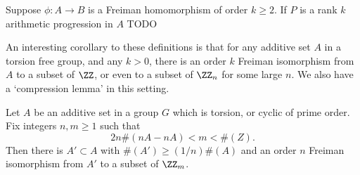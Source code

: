 \begin{theorem}
    Suppose $\phi: A \to B$ is a Freiman homomorphism of order $k \geq 2$. If $P$ is a rank $k$ arithmetic progression in $A$ TODO
\end{theorem}

An interesting corollary to these definitions is that for any additive set $A$ in a torsion free group, and any $k > 0$, there is an order $k$ Freiman isomorphism from $A$ to a subset of $\ZZ$, or even to a subset of $\ZZ_n$ for some large $n$. We also have a `compression lemma' in this setting.

\begin{theorem}
    Let $A$ be an additive set in a group $G$ which is torsion, or cyclic of prime order. Fix integers $n,m \geq 1$ such that
    \[ 2n \#(nA - nA) < m < \#(Z). \]
    Then there is $A' \subset A$ with $\#(A') \geq (1/n) \#(A)$ and an order $n$ Freiman isomorphism from $A'$ to a subset of $\ZZ_m$.
\end{theorem}
